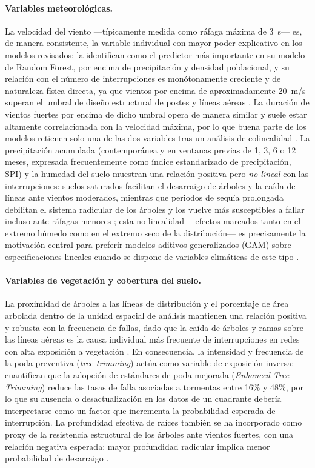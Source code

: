 \paragraph{Variables meteorológicas.} La velocidad del viento —típicamente medida como ráfaga máxima de 3~s— es, de manera consistente, la variable individual con mayor poder explicativo en los modelos revisados: \textcite{ref43} la identifican como el predictor más importante en su modelo de Random Forest, por encima de precipitación y densidad poblacional, y su relación con el número de interrupciones es monótonamente creciente y de naturaleza física directa, ya que vientos por encima de aproximadamente 20~m/s superan el umbral de diseño estructural de postes y líneas aéreas \parencite{ref43}. La duración de vientos fuertes por encima de dicho umbral opera de manera similar y suele estar altamente correlacionada con la velocidad máxima, por lo que buena parte de los modelos retienen solo una de las dos variables tras un análisis de colinealidad \parencite{ref43}. La precipitación acumulada (contemporánea y en ventanas previas de 1, 3, 6 o 12 meses, expresada frecuentemente como índice estandarizado de precipitación, SPI) y la humedad del suelo muestran una relación positiva pero \emph{no lineal} con las interrupciones: suelos saturados facilitan el desarraigo de árboles y la caída de líneas ante vientos moderados, mientras que periodos de sequía prolongada debilitan el sistema radicular de los árboles y los vuelve más susceptibles a fallar incluso ante ráfagas menores \parencite{ref41,ref43}; esta no linealidad —efectos marcados tanto en el extremo húmedo como en el extremo seco de la distribución— es precisamente la motivación central para preferir modelos aditivos generalizados (GAM) sobre especificaciones lineales cuando se dispone de variables climáticas de este tipo \parencite{ref41}.

\paragraph{Variables de vegetación y cobertura del suelo.} La proximidad de árboles a las líneas de distribución y el porcentaje de área arbolada dentro de la unidad espacial de análisis mantienen una relación positiva y robusta con la frecuencia de fallas, dado que la caída de árboles y ramas sobre las líneas aéreas es la causa individual más frecuente de interrupciones en redes con alta exposición a vegetación \parencite{ref15,ref43}. En consecuencia, la intensidad y frecuencia de la poda preventiva (\emph{tree trimming}) actúa como variable de exposición inversa: \textcite{ref15} cuantifican que la adopción de estándares de poda mejorada (\emph{Enhanced Tree Trimming}) reduce las tasas de falla asociadas a tormentas entre 16\% y 48\%, por lo que su ausencia o desactualización en los datos de un cuadrante debería interpretarse como un factor que incrementa la probabilidad esperada de interrupción. La profundidad efectiva de raíces también se ha incorporado como proxy de la resistencia estructural de los árboles ante vientos fuertes, con una relación negativa esperada: mayor profundidad radicular implica menor probabilidad de desarraigo \parencite{ref43}.

